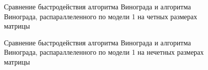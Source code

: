 \documentclass[a4paper, 14pt]{article}
\begin{document}
		          \begin{figure}[h]
        	\caption{Сравнение быстродействия алгоритма Винограда и алгоритма Винограда, распараллеленного по модели 1 на четных размерах матрицы}
        	\label{0-1c}
        \end{figure}  
        \newpage      
        \begin{figure}[h]
        	\caption{Сравнение быстродействия алгоритма Винограда и алгоритма Винограда, распараллеленного по модели 1 на нечетных размерах матрицы}
        	\label{0-1n}
        \end{figure}   
             
\end{document}
